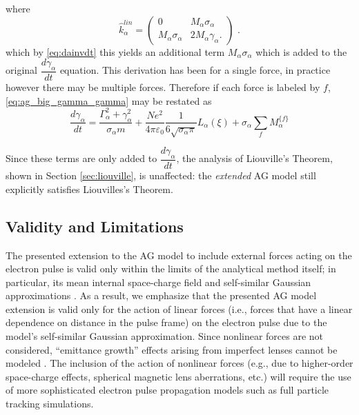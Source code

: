 where
\begin{equation}
\hat{k}^{lin}_{\alpha} =
\begin{pmatrix}
0 & M_{\alpha} \sigma_{\alpha} \\
M_{\alpha} \sigma_{\alpha} & 2 M_{\alpha} \gamma_{\alpha} \text{.}
\end{pmatrix} \text{ .}
\end{equation}
which by \ref{eq:dainvdt} this yields an additional term $M_{\alpha} \sigma_{\alpha}$ which is added to the original $\dfrac{d \gamma_{\alpha}}{d t}$ equation.
This derivation has been for a single force, in practice however there may be multiple forces.
Therefore if each force is labeled by $f$, \ref{eq:ag_big_gamma_gamma} may be restated as
\begin{equation}
  \frac{d\gamma_{\alpha}}{dt} = \frac{ \Gamma_{\alpha}^2 + \gamma_{\alpha}^2 }{\sigma_{\alpha} m}
    + \frac{N e^2}{4\pi\varepsilon_0} \frac{1}{6 \sqrt{\sigma_{\alpha}\pi}} L_{\alpha}(\xi) + \sigma_{\alpha} \sum\limits_{f} M_{\alpha}^{\lbrace f \rbrace} 
\end{equation}

Since these terms are only added to $\dfrac{d \gamma_{\alpha}}{d t}$, the analysis of Liouville's Theorem, shown in Section \ref{sec:liouville}, is unaffected: the \textit{extended} AG model still explicitly satisfies Liouvilles's Theorem.

\subsection{Validity and Limitations} \label{extension_limitations}

The presented extension to the AG model to include external forces acting on the electron pulse is valid only within the limits of the analytical method itself; in particular, its mean internal space-charge field and self-similar Gaussian approximations \cite{michalik_analytic_2006}.
As a result, we emphasize that the presented AG model extension is valid only for the action of linear forces (i.e., forces that have a linear dependence on distance in the pulse frame) on the electron pulse due to the model's self-similar Gaussian approximation.
Since nonlinear forces are not considered, ``emittance growth'' effects arising from imperfect lenses cannot be modeled \cite{oshea_reversible_1998}.
The inclusion of the action of nonlinear forces (e.g., due to higher-order space-charge effects, spherical magnetic lens aberrations, etc.) will require the use of more sophisticated electron pulse propagation models such as full particle tracking simulations.

